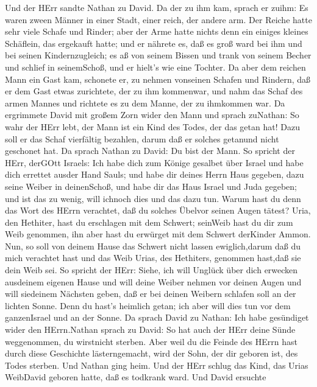  Und der HErr sandte Nathan zu David. Da der zu ihm kam,
sprach er zuihm: Es waren zween Männer in einer Stadt, einer reich, der
andere arm.  Der Reiche hatte sehr viele Schafe und Rinder;
 aber der Arme hatte nichts denn ein einiges kleines
Schäflein, das ergekauft hatte; und er nährete es, daß es groß ward bei
ihm und bei seinen Kindernzugleich; es aß von seinem Bissen und trank
von seinem Becher und schlief in seinemSchoß, und er hielt's wie eine
Tochter.  Da aber dem reichen Mann ein Gast kam, schonete
er, zu nehmen vonseinen Schafen und Rindern, daß er dem Gast etwas
zurichtete, der zu ihm kommenwar, und nahm das Schaf des armen Mannes
und richtete es zu dem Manne, der zu ihmkommen war.  Da
ergrimmete David mit großem Zorn wider den Mann und sprach zuNathan: So
wahr der HErr lebt, der Mann ist ein Kind des Todes, der das getan hat!
 Dazu soll er das Schaf vierfältig bezahlen, darum daß er
solches getanund nicht geschonet hat.  Da sprach Nathan zu
David: Du bist der Mann. So spricht der HErr, derGOtt Israels: Ich habe
dich zum Könige gesalbet über Israel und habe dich errettet ausder Hand
Sauls;  und habe dir deines Herrn Haus gegeben, dazu seine
Weiber in deinenSchoß, und habe dir das Haus Israel und Juda gegeben;
und ist das zu wenig, will ichnoch dies und das dazu tun. 
Warum hast du denn das Wort des HErrn verachtet, daß du solches Übelvor
seinen Augen tätest? Uria, den Hethiter, hast du erschlagen mit dem
Schwert; seinWeib hast du dir zum Weib genommen, ihn aber hast du
erwürget mit dem Schwert derKinder Ammon.  Nun, so soll von
deinem Hause das Schwert nicht lassen ewiglich,darum daß du mich
verachtet hast und das Weib Urias, des Hethiters, genommen hast,daß sie
dein Weib sei.  So spricht der HErr: Siehe, ich will
Unglück über dich erwecken ausdeinem eigenen Hause und will deine Weiber
nehmen vor deinen Augen und will siedeinem Nächsten geben, daß er bei
deinen Weibern schlafen soll an der lichten Sonne.  Denn du
hast's heimlich getan; ich aber will dies tun vor dem ganzenIsrael und
an der Sonne.  Da sprach David zu Nathan: Ich habe
gesündiget wider den HErrn.Nathan sprach zu David: So hat auch der HErr
deine Sünde weggenommen, du wirstnicht sterben.  Aber weil
du die Feinde des HErrn hast durch diese Geschichte lästerngemacht, wird
der Sohn, der dir geboren ist, des Todes sterben.  Und
Nathan ging heim. Und der HErr schlug das Kind, das Urias WeibDavid
geboren hatte, daß es todkrank ward.  Und David ersuchte

